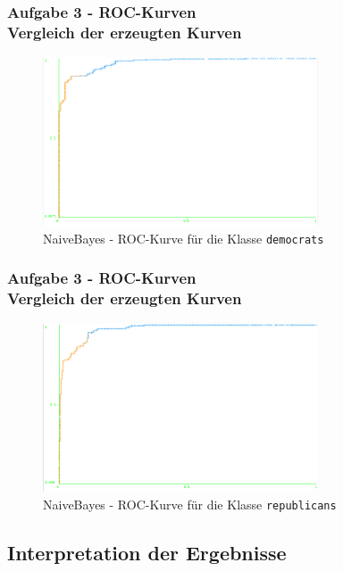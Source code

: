 \documentclass[accentcolor=tud6b,colorbacktitle,inverttitle,landscape,german,presentation,t]{tudbeamer}
\begin{document}
    \begin{frame}[t]
    \frametitle{Aufgabe 3 - ROC-Kurven\\ Vergleich der erzeugten Kurven}
        \begin{figure}[htbp]
            \centering
            \includegraphics[height=5cm]{roc-naivebayes-democrats}
            \caption{NaiveBayes - ROC-Kurve für die Klasse \texttt{democrats}}
        \end{figure}
    \end{frame}
    
    \begin{frame}[t]
    \frametitle{Aufgabe 3 - ROC-Kurven\\ Vergleich der erzeugten Kurven}
        \begin{figure}[htbp]
            \centering
            \includegraphics[height=5cm]{roc-naivebayes-republicans}
            \caption{NaiveBayes - ROC-Kurve für die Klasse \texttt{republicans}}
        \end{figure}
    \end{frame}
    
    \subsection{Interpretation der Ergebnisse}
    
\end{document}
